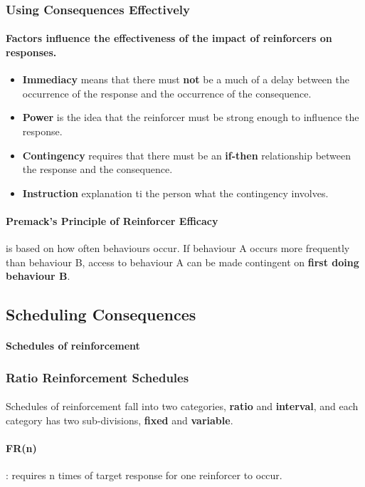 \documentclass{article}
\begin{document}
	\subsubsection{Using Consequences Effectively}
	\paragraph{Factors influence the effectiveness of the impact of reinforcers on responses.}
	\begin{itemize}
		\item \textbf{Immediacy} means that there must \textbf{not} be a much of a delay between the occurrence of the response and the occurrence of the consequence.
		\item \textbf{Power} is the idea that the reinforcer must be strong enough to influence the response.
		\item \textbf{Contingency} requires that there must be an \textbf{if-then} relationship between the response and the consequence.
		\item \textbf{Instruction} explanation ti the person what the contingency involves.
	\end{itemize}
	\paragraph{Premack's Principle of Reinforcer Efficacy} is based on how often behaviours occur. If behaviour A occurs more frequently than behaviour B, access to behaviour A can be made contingent on \textbf{first doing behaviour B}.
	\subsection{Scheduling Consequences}
	\paragraph{Schedules of reinforcement}
	\subsubsection{Ratio Reinforcement Schedules}
	\paragraph{} Schedules of reinforcement fall into two categories, \textbf{ratio} and \textbf{interval}, and each category has two sub-divisions, \textbf{fixed} and \textbf{variable}.
	\paragraph{FR(n)}: requires n times of target response for one reinforcer to occur.
\end{document}
